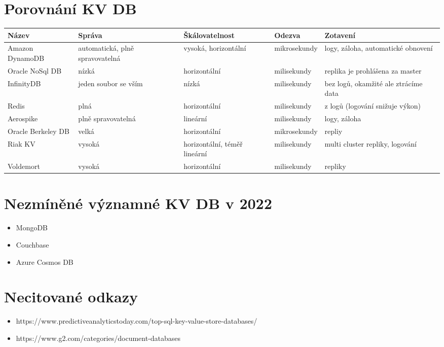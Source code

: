 \documentclass[czech,bachelor,dept460,male,csharp,cpdeclaration]{diploma}
\begin{document}
	\section {Porovnání KV DB}
			\begin{tabular}{ |l||p{2cm} p{2cm} l p{4cm} | } 
				\hline
				Název & Správa & Škálovatelnost & Odezva & Zotavení \\
				\hline
				Amazon DynamoDB & automatická, plně spravovatelná & vysoká, horizontální & mikrosekundy & logy, záloha, automatické obnovení \\
				\hline
				Oracle NoSql DB & nízká & horizontální & milisekundy & replika je prohlášena za master\\ 
				\hline
				InfinityDB & jeden soubor se vším & nízká & milisekundy & bez logů, okamžité ale ztrácíme data\\ 
				\hline
				Redis & plná & horizontální & milisekundy & z logů (logování snižuje výkon)\\
				\hline
				Aerospike & plně spravovatelná & lineární & milisekundy &  logy, záloha\\
				\hline
				Oracle Berkeley DB & velká & horizontální & mikrosekundy & repliy \\
				\hline
				Riak KV & vysoká & horizontální, téměř lineární & milisekundy & multi cluster repliky, logování\\
				\hline
				Voldemort & vysoká & horizontální & milisekundy &  repliky \\
				\hline
			\end{tabular}


	\section {Nezmíněné významné KV DB v 2022}
		\begin{itemize}
			\item MongoDB
			\item Couchbase
			\item Azure Cosmos DB
		\end{itemize}

	 
	 \section{Necitované odkazy}
	 	\begin{itemize}
	 		\item https://www.predictiveanalyticstoday.com/top-sql-key-value-store-databases/
	 		\item https://www.g2.com/categories/document-databases
	 	\end{itemize}
\end{document}
